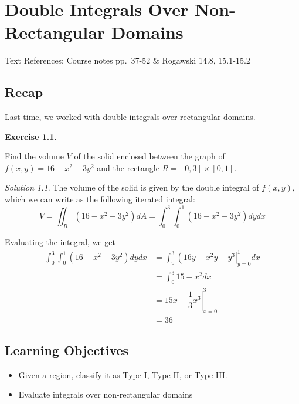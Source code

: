 \documentclass[
]{book}
\providecommand{\tightlist}{%
  \setlength{\itemsep}{0pt}\setlength{\parskip}{0pt}}
\theoremstyle{definition}
\theoremstyle{definition}
\theoremstyle{definition}
\newtheorem{exercise}{Exercise}[chapter]
\theoremstyle{definition}
\theoremstyle{remark}
\newtheorem*{solution}{Solution}
\begin{document}
\hypertarget{lec-11}{%
\chapter{Double Integrals Over Non-Rectangular Domains}\label{lec-11}}

Text References: Course notes pp.~37-52 \& Rogawski 14.8, 15.1-15.2

\hypertarget{recap-9}{%
\section{Recap}\label{recap-9}}

Last time, we worked with double integrals over rectangular domains.

\begin{exercise}
\protect\hypertarget{exr:unlabeled-div-81}{}\label{exr:unlabeled-div-81}

Find the volume \(V\) of the solid enclosed between the graph of \(f(x,y)=16-x^2-3y^2\) and the rectangle \(R=[0,3]\times [0,1]\).

\end{exercise}

\begin{solution}

The volume of the solid is given by the double integral of \(f(x,y)\), which we can write as the following iterated integral: \[V=\displaystyle \iint_R (16-x^2-3y^2)dA = \int_0^3\int_0^1 (16-x^2-3y^2)dy dx\]

Evaluating the integral, we get
\begin{align*}
\int_0^3\int_0^1 (16-x^2-3y^2)dy dx & = \int_0^3 \left (16y-x^2y-y^3 \right|_{y=0}^1 dx \\
&= \int_0^3 15-x^2 dx \\
&= \left . 15x-\dfrac{1}{3}x^3\right|_{x=0}^3 \\
&= 36
\end{align*}

\end{solution}

\hypertarget{learning-objectives-10}{%
\section{Learning Objectives}\label{learning-objectives-10}}

\begin{itemize}
\tightlist
\item
  Given a region, classify it as Type I, Type II, or Type III.
\item
  Evaluate integrals over non-rectangular domains
\end{itemize}
\end{document}

